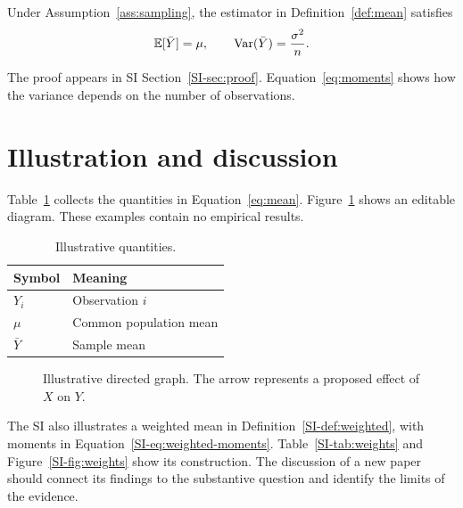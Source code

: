 \documentclass[12pt]{article}
\begin{document}
\begin{proposition}\label{prop:mean}
Under Assumption~\ref{ass:sampling}, the estimator in Definition~\ref{def:mean} satisfies
\begin{equation}\label{eq:moments}
\mathbb{E}[\bar Y]=\mu,
\qquad
\operatorname{Var}(\bar Y)=\frac{\sigma^2}{n}.
\end{equation}
\end{proposition}

The proof appears in SI Section~\ref{SI-sec:proof}. Equation~\eqref{eq:moments} shows how the variance depends on the number of observations.

\clearpage
\section{Illustration and discussion}\label{sec:illustration}

Table~\ref{tab:notation} collects the quantities in Equation~\eqref{eq:mean}. Figure~\ref{fig:diagram} shows an editable diagram. These examples contain no empirical results.

\begin{table}[!htbp]
\centering
\caption{Illustrative quantities.}
\label{tab:notation}
\begin{tabularx}{\linewidth}{@{}lX@{}}
\toprule
Symbol & Meaning \\
\midrule
$Y_i$ & Observation $i$ \\
$\mu$ & Common population mean \\
$\bar Y$ & Sample mean \\
\bottomrule
\end{tabularx}
\end{table}

\begin{figure}[!htbp]
\centering

\caption{Illustrative directed graph. The arrow represents a proposed effect of $X$ on $Y$.}
\label{fig:diagram}
\end{figure}

The SI also illustrates a weighted mean in Definition~\ref{SI-def:weighted}, with moments in Equation~\eqref{SI-eq:weighted-moments}. Table~\ref{SI-tab:weights} and Figure~\ref{SI-fig:weights} show its construction. The discussion of a new paper should connect its findings to the substantive question and identify the limits of the evidence.

\FloatBarrier
\ifdefined\printbibliography
\printbibliography[title={References}]
\else

\fi

\clearpage

\end{document}
